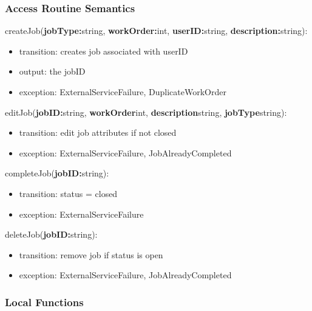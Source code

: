 \documentclass[12pt, titlepage]{article}
\begin{document}
\subsubsection{Access Routine Semantics}

\noindent createJob(\textbf{jobType:}string, \textbf{workOrder:}int,
\textbf{userID:}string, \textbf{description:}string):
\begin{itemize}
  \item transition: creates job associated with userID
  \item output: the jobID
  \item exception:  ExternalServiceFailure, DuplicateWorkOrder
\end{itemize}

\noindent editJob(\textbf{jobID:}string, \textbf{workOrder}int,
\textbf{description}string, \textbf{jobType}string):
\begin{itemize}
  \item transition: edit job attributes if not closed
  \item exception:  ExternalServiceFailure, JobAlreadyCompleted
\end{itemize}

\noindent completeJob(\textbf{jobID:}string):
\begin{itemize}
  \item transition: status = closed
  \item exception:  ExternalServiceFailure
\end{itemize}

\noindent deleteJob(\textbf{jobID:}string):
\begin{itemize}
  \item transition: remove job if status is open
  \item exception:  ExternalServiceFailure, JobAlreadyCompleted
\end{itemize}



\subsubsection{Local Functions}
\end{document}
